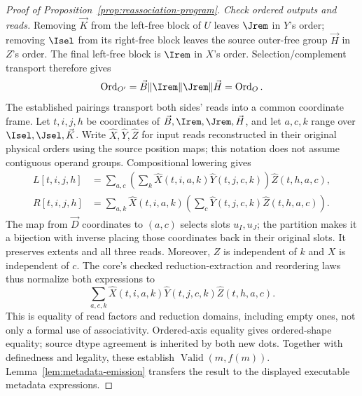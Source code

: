 \begin{proof}[Proof of Proposition~\ref{prop:reassociation-program}]
\emph{Check ordered outputs and reads.}
Removing $\vec K$ from the left-free block of $U$ leaves $\Jrem$ in $Y$'s
order; removing $\Isel$ from its right-free block leaves the source
outer-free group $\vec H$ in $Z$'s order. The final left-free block is $\Irem$
in $X$'s order. Selection/complement transport therefore gives
\begin{equation}
 \operatorname{Ord}_{O'}=\vec B\Vert\Irem\Vert\Jrem\Vert \vec H=\operatorname{Ord}_O.
 \label{eq:reassociation-output-proof}
\end{equation}
The established pairings transport both sides' reads into a common
coordinate frame. Let $t,i,j,h$ be coordinates of
$\vec B,\Irem,\Jrem,\vec H$, and let $a,c,k$ range over
$\Isel,\Jsel,\vec K$. Write $\widehat X,\widehat Y,\widehat Z$ for input
reads reconstructed in their original physical orders using the source
position maps; this notation does not assume contiguous operand groups.
Compositional lowering gives
\begin{equation}
\begin{aligned}
 L[t,i,j,h]
 &=\sum_{a,c}\left(\sum_k
       \widehat X(t,i,a,k)\widehat Y(t,j,c,k)\right)
       \widehat Z(t,h,a,c),\\
 R[t,i,j,h]
 &=\sum_{a,k}\widehat X(t,i,a,k)
       \left(\sum_c\widehat Y(t,j,c,k)\widehat Z(t,h,a,c)\right).
\end{aligned}
\label{eq:reassociation-lowered}
\end{equation}
The map from $\vec D$ coordinates to $(a,c)$ selects slots $u_I,u_J$;
the partition makes it a bijection with inverse placing those coordinates
back in their original slots. It preserves extents and all three reads.
Moreover, $Z$ is independent of $k$ and $X$ is independent of $c$.
The core's checked reduction-extraction and reordering laws thus normalize
both expressions to
\begin{equation}
 \sum_{a,c,k}\widehat X(t,i,a,k)
                 \widehat Y(t,j,c,k)\widehat Z(t,h,a,c).
 \label{eq:reassociation-common-normal-form}
\end{equation}
This is equality of read factors and reduction domains, including empty
ones, not only a formal use of associativity. Ordered-axis equality gives
ordered-shape equality; source dtype agreement is inherited by both new
dots. Together with definedness and legality, these establish
$\operatorname{Valid}(m,f(m))$. Lemma~\ref{lem:metadata-emission} transfers
the result to the displayed executable metadata expressions.
\end{proof}
